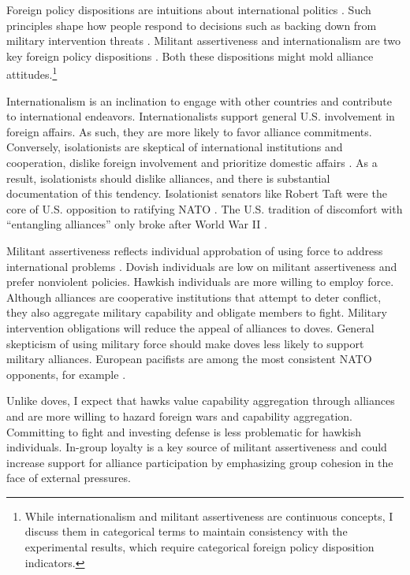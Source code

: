\documentclass[12pt]{article}
\begin{document}
Foreign policy dispositions are intuitions about international politics \citep{KertzerTingley2018}. 
Such principles shape how people respond to decisions such as backing down from military intervention threats \citep{KertzerBrutger2016}. 
Militant assertiveness and internationalism are two key foreign policy dispositions \citep{Herrmannetal1999}.
Both these dispositions might mold alliance attitudes.\footnote{While internationalism and militant assertiveness are continuous concepts, I discuss them in categorical terms to maintain consistency with the experimental results, which require categorical foreign policy disposition indicators.}


Internationalism is an inclination to engage with other countries and contribute to international endeavors. 
Internationalists support general U.S. involvement in foreign affairs.
As such, they are more likely to favor alliance commitments. 
Conversely, isolationists are skeptical of international institutions and cooperation, dislike foreign involvement and prioritize domestic affairs \citep{Kertzer2013}. 
As a result, isolationists should dislike alliances, and there is substantial documentation of this tendency. 
Isolationist senators like Robert Taft were the core of U.S. opposition to ratifying NATO \citep{Kaplan2007}.
The U.S. tradition of discomfort with ``entangling alliances'' only broke after World War II \citep{Kupchan2020}.


Militant assertiveness reflects individual approbation of using force to address international problems \citep{Herrmannetal1999}. 
Dovish individuals are low on militant assertiveness and prefer nonviolent policies.
Hawkish individuals are more willing to employ force.
Although alliances are cooperative institutions that attempt to deter conflict, they also aggregate military capability and obligate members to fight.
Military intervention obligations will reduce the appeal of alliances to doves.
General skepticism of using military force should make doves less likely to support military alliances.  
European pacifists are among the most consistent NATO opponents, for example \citep{Thies2015}.


Unlike doves, I expect that hawks value capability aggregation through alliances and are more willing to hazard foreign wars and capability aggregation. 
Committing to fight and investing defense is less problematic for hawkish individuals. 
In-group loyalty is a key source of militant assertiveness \citep{Kertzeretal2014} and could increase support for alliance participation by emphasizing group cohesion in the face of external pressures.
\end{document}
